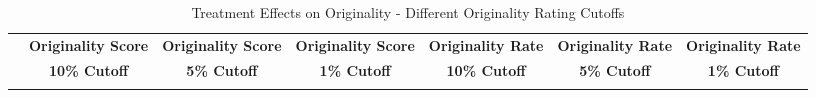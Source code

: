 \begin{landscape}
\begin{table}[h]%
\setlength\tabcolsep{2pt}
\caption{Treatment Effects on Originality - Different Originality Rating Cutoffs}
\label{tab:CreativityRobustness}
\begin{center}%
{\small\renewcommand{\arraystretch}{.9}%
\begin{tabular}{lcccccc}
\hline\hline\noalign{\smallskip}
 & \bf Originality Score & \bf Originality Score & \bf Originality Score & \bf Originality Rate & \bf Originality Rate & \bf Originality Rate \\
 & \bf 10\% Cutoff       & \bf 5\% Cutoff                & \bf 1\% Cutoff                & \bf 10\% Cutoff              & \bf 5\% Cutoff               & \bf 1\% Cutoff \\
\hline
\noalign{\smallskip}


\end{tabular}}
\end{center}
\end{table}
\end{landscape}
